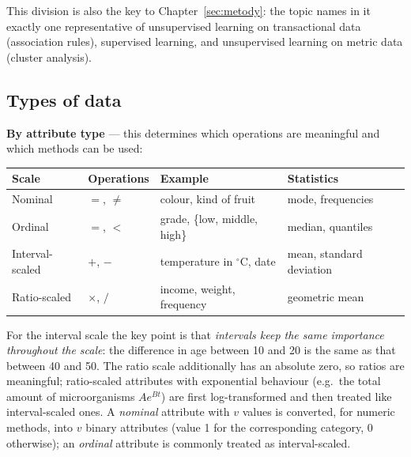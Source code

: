 \documentclass[11pt,a4paper]{article}
\theoremstyle{definition}
\begin{document}
This division is also the key to Chapter~\ref{sec:metody}: the topic names in it exactly one
representative of unsupervised learning on transactional data (association rules), supervised
learning, and unsupervised learning on metric data (cluster analysis).

\subsection{Types of data}

\textbf{By attribute type} --- this determines which operations are meaningful and which methods
can be used:

\begin{center}
\small
\begin{tabular}{@{}p{3.3cm}p{2.2cm}p{5.2cm}p{4.0cm}@{}}
\toprule
\textbf{Scale} & \textbf{Operations} & \textbf{Example} & \textbf{Statistics} \\
\midrule
Nominal & $=$, $\neq$ & colour, kind of fruit & mode, frequencies \\
Ordinal & $=$, $<$ & grade, \{low, middle, high\} & median, quantiles \\
Interval-scaled & $+$, $-$ & temperature in $^{\circ}$C, date & mean, standard deviation \\
Ratio-scaled & $\times$, $/$ & income, weight, frequency & geometric mean \\
\bottomrule
\end{tabular}
\end{center}

For the interval scale the key point is that \emph{intervals keep the same importance
throughout the scale}: the difference in age between 10 and 20 is the same as that between 40
and 50. The ratio scale additionally has an absolute zero, so ratios are meaningful;
ratio-scaled attributes with exponential behaviour (e.g.\ the total amount of microorganisms
$Ae^{Bt}$) are first log-transformed and then treated like interval-scaled ones. A
\emph{nominal} attribute with $v$ values is converted, for numeric methods, into $v$ binary
attributes (value 1 for the corresponding category, 0 otherwise); an \emph{ordinal} attribute is
commonly treated as interval-scaled.
\end{document}

